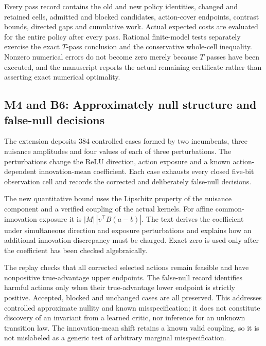 Every pass record contains the old and new policy identities, changed
and retained cells, admitted and blocked candidates, action-cover
endpoints, contrast bounds, directed gaps and cumulative work. Actual
expected costs are evaluated for the entire policy after every pass.
Rational finite-model tests separately exercise the exact \(T\)-pass
conclusion and the conservative whole-cell inequality. Nonzero numerical
errors do not become zero merely because \(T\) passes have been
executed, and the manuscript reports the actual remaining certificate
rather than asserting exact numerical optimality.

\hypertarget{m4-and-b6-approximately-null-structure-and-false-null-decisions}{%
\subsection{M4 and B6: Approximately null structure and false-null
decisions}\label{m4-and-b6-approximately-null-structure-and-false-null-decisions}}

The extension deposits 384 controlled cases formed by two incumbents,
three nuisance amplitudes and four values of each of three
perturbations. The perturbations change the ReLU direction, action
exposure and a known action-dependent innovation-mean coefficient. Each
case exhausts every closed five-bit observation cell and records the
corrected and deliberately false-null decisions.

The new quantitative bound uses the Lipschitz property of the nuisance
component and a verified coupling of the actual kernels. For affine
common-innovation exposure it is \(|M|\,|v^\top B(a-b)|\). The text
derives the coefficient under simultaneous direction and exposure
perturbations and explains how an additional innovation discrepancy must
be charged. Exact zero is used only after the coefficient has been
checked algebraically.

The replay checks that all corrected selected actions remain feasible
and have nonpositive true-advantage upper endpoints. The false-null
record identifies harmful actions only when their true-advantage lower
endpoint is strictly positive. Accepted, blocked and unchanged cases are
all preserved. This addresses controlled approximate nullity and known
misspecification; it does not constitute discovery of an invariant from
a learned critic, nor inference for an unknown transition law. The
innovation-mean shift retains a known valid coupling, so it is not
mislabeled as a generic test of arbitrary marginal misspecification.

